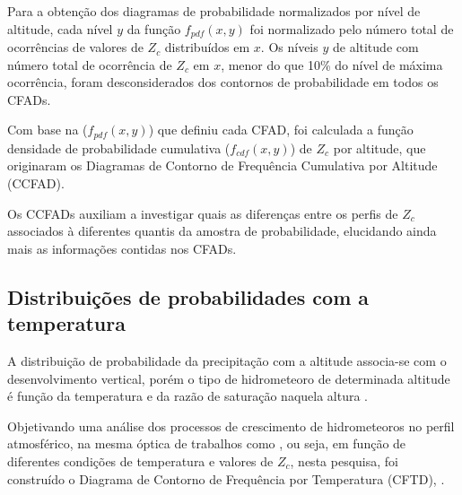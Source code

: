 Para a obtenção dos diagramas de probabilidade normalizados por nível de altitude, cada nível $y$ da função $f_{pdf}(x,y)$ foi normalizado pelo número total de ocorrências de valores de $Z_c$ distribuídos em $x$. Os níveis $y$ de altitude com número total de ocorrência de $Z_c$ em $x$, menor do que 10\% do nível de máxima ocorrência, foram desconsiderados dos contornos de probabilidade em todos os CFADs.

Com base na ($f_{pdf}(x,y)$) que definiu cada CFAD, foi calculada a função densidade de probabilidade cumulativa ($f_{cdf}(x,y)$) de $Z_c$ por altitude, que originaram os Diagramas de Contorno de Frequência Cumulativa por Altitude (CCFAD).     



Os CCFADs auxiliam a investigar quais as diferenças entre os perfis de $Z_c$ associados à diferentes quantis da amostra de probabilidade, elucidando ainda mais as informações contidas nos CFADs.





\subsection{Distribuições de probabilidades com a temperatura}
A distribuição de probabilidade da precipitação com a altitude associa-se com o desenvolvimento vertical, porém o tipo de hidrometeoro de determinada altitude é função da temperatura e da razão de saturação naquela altura \cite{Takahashi1978,Saunders1999}. 

Objetivando uma análise dos processos de crescimento de hidrometeoros no perfil atmosférico, na mesma óptica de trabalhos como , ou seja, em função de diferentes condições de temperatura e valores de $Z_c$, nesta pesquisa, foi  construído o  Diagrama de Contorno de Frequência por Temperatura (CFTD), . 

